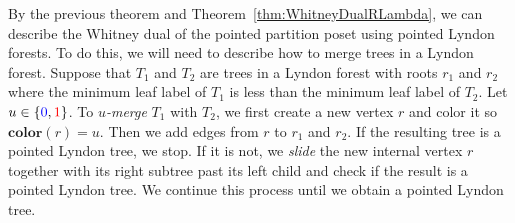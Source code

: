 \documentclass[11pt]{article}
\theoremstyle{definition}
\numberwithin{equation}{section}
\newcommand{\clr}{\mathbf{color}}
\newcommand{\tre}[1]{{\color{red}{#1}}}
\newcommand{\tbl}[1]{{\color{blue}{#1}}}
\begin{document}
 By the previous theorem and Theorem~\ref{thm:WhitneyDualRLambda}, we can describe the Whitney dual of the pointed partition poset using pointed Lyndon forests.  To do this, we will need to describe how to merge trees in a Lyndon forest. Suppose that $T_1$ and $T_2$ are trees in a Lyndon forest with roots $r_1$ and $r_2$ where  the minimum leaf label of $T_1$ is less than the minimum leaf label of $T_2$.  Let $u\in \{\tbl{0},\tre{1}\}$.   To \emph{$u$-merge} $T_1$ with $T_2$, we first create a new vertex $r$ and color it so $\clr(r)=u$. Then we add edges from $r$ to $r_1$ and $r_2$.   If the resulting tree is a pointed Lyndon tree, we stop.  If it is not, we  \emph{slide} the new internal vertex $r$ together with its right subtree  past its left child and check if the result is a pointed Lyndon tree.  We continue this process until we obtain a pointed Lyndon tree.  
 
\end{document}
